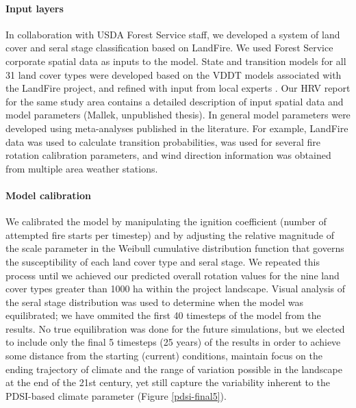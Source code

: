 \documentclass[12pt]{article}
\begin{document}
\begin{spacing}{1}
\paragraph{Input layers}
In collaboration with USDA Forest Service staff, we developed a system of land cover and seral stage classification based on LandFire. We used Forest Service corporate spatial data as inputs to the model. State and transition models for all 31 land cover types were developed based on the VDDT models associated with the LandFire project, and refined with input from local experts . Our HRV report for the same study area contains a detailed description of input spatial data and model parameters (Mallek, unpublished thesis). In general model parameters were developed using meta-analyses published in the literature. For example, LandFire data was used to calculate transition probabilities, \citet{Mallek2013} was used for several fire rotation calibration parameters, and wind direction information was obtained from multiple area weather stations.

\paragraph{Model calibration}
We calibrated the model by manipulating the ignition coefficient (number of attempted fire starts per timestep) and by adjusting the relative magnitude of the scale parameter in the Weibull cumulative distribution function that governs the susceptibility of each land cover type and seral stage. We repeated this process until we achieved our predicted overall rotation values for the nine land cover types greater than 1000 ha within the project landscape. Visual analysis of the seral stage distribution was used to determine when the model was equilibrated; we have ommited the first 40 timesteps of the model from the results. No true equilibration was done for the future simulations, but we elected to include only the final 5 timesteps (25 years) of the results in order to achieve some distance from the starting (current) conditions, maintain focus on the ending trajectory of climate and the range of variation possible in the landscape at the end of the 21st century, yet still capture the variability inherent to the PDSI-based climate parameter (Figure \ref{pdsi-final5}).



\end{spacing}
\end{document}

